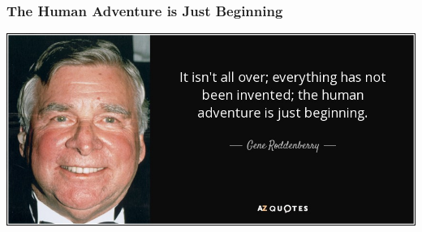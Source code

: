 \begin{frame}
\frametitle{The Human Adventure is Just Beginning}

\begin{center}
	\includegraphics[width=\textwidth]{images/roddenberry.jpg}
\end{center}

\end{frame}




